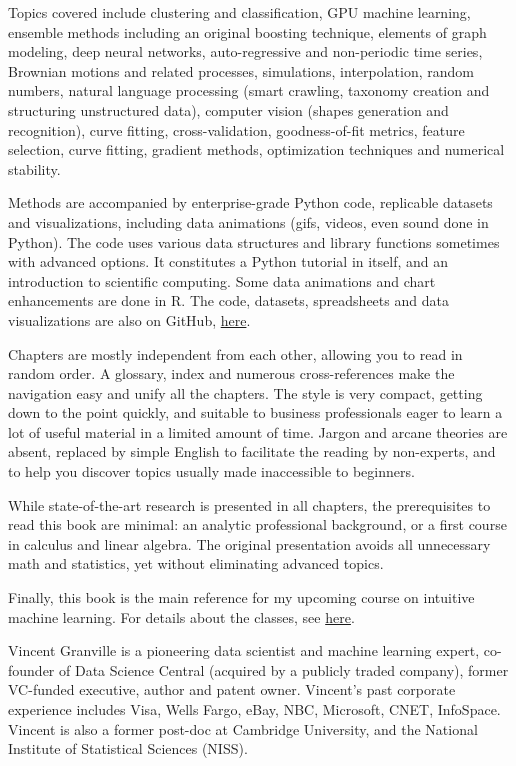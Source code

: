 \documentclass[oneside,10pt]{book}
\begin{document}
Topics covered include clustering and classification, GPU machine learning, ensemble methods including an original boosting technique, elements of graph modeling, deep neural networks, auto-regressive and non-periodic time series, Brownian motions and related processes, simulations, interpolation, random numbers, natural language processing (smart crawling, taxonomy creation and structuring unstructured data), computer vision (shapes generation and recognition), curve fitting, cross-validation, goodness-of-fit metrics, feature selection, curve fitting, gradient methods, optimization techniques and numerical stability.

Methods are accompanied by enterprise-grade Python code, replicable datasets and  visualizations, including data animations (gifs, videos, even sound done in Python). The code
 uses various data structures and library functions sometimes with advanced options. It constitutes a Python tutorial in itself, and  an introduction to scientific computing. Some data animations and chart enhancements are done in R. The code, datasets, spreadsheets and data visualizations are also on GitHub, \href{https://github.com/VincentGranville/Machine-Learning}{here}.

Chapters are mostly independent from each other, allowing you to read in random order. A glossary, index and numerous cross-references make the navigation easy and unify all the chapters. The style is very compact, getting down to the point quickly, and suitable to business professionals eager to learn a lot of useful material in a limited amount of time. Jargon and arcane theories are absent, replaced by simple English to facilitate the reading by non-experts, and to help you discover topics usually made inaccessible to beginners.

While state-of-the-art research is presented in all chapters, the prerequisites to read this book are minimal: an analytic professional background, or a first course in calculus and linear algebra. The original presentation avoids all unnecessary math and statistics, yet without eliminating advanced topics.


Finally, this book is the main reference for my upcoming course on intuitive machine learning. For details about the classes, see \href{https://mltechniques.com/courses/}{here}. \vspace{1ex}

\vspace{1ex}

\noindent Vincent Granville is a pioneering data scientist and machine learning expert, co-founder of Data Science Central (acquired by a publicly traded company), former VC-funded executive, author and patent owner. Vincent’s past corporate experience includes Visa, Wells Fargo, eBay, NBC, Microsoft, CNET, InfoSpace. Vincent is also a former post-doc at Cambridge University, and the National Institute of Statistical Sciences (NISS).
\end{document}
